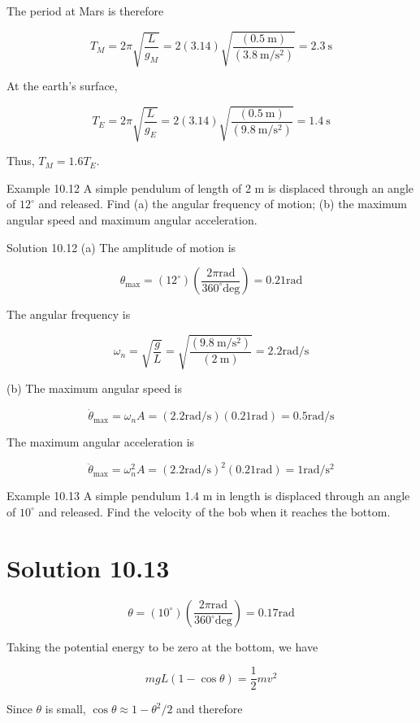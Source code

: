 \documentclass[10pt]{article}
\begin{document}
The period at Mars is therefore

$$
T_{M}=2 \pi \sqrt{\frac{L}{g_{M}}}=2(3.14) \sqrt{\frac{(0.5 \mathrm{~m})}{\left(3.8 \mathrm{~m} / \mathrm{s}^{2}\right)}}=2.3 \mathrm{~s}
$$

At the earth's surface,

$$
T_{E}=2 \pi \sqrt{\frac{L}{g_{E}}}=2(3.14) \sqrt{\frac{(0.5 \mathrm{~m})}{\left(9.8 \mathrm{~m} / \mathrm{s}^{2}\right)}}=1.4 \mathrm{~s}
$$

Thus, $T_{M}=1.6 T_{E}$.

Example 10.12 A simple pendulum of length of 2 m is displaced through an angle of $12^{\circ}$ and released. Find (a) the angular frequency of motion; (b) the maximum angular speed and maximum angular acceleration.

Solution 10.12 (a) The amplitude of motion is

$$
\theta_{\max }=\left(12^{\circ}\right)\left(\frac{2 \pi \mathrm{rad}}{360^{\circ} \mathrm{deg}}\right)=0.21 \mathrm{rad}
$$

The angular frequency is

$$
\omega_{n}=\sqrt{\frac{g}{L}}=\sqrt{\frac{\left(9.8 \mathrm{~m} / \mathrm{s}^{2}\right)}{(2 \mathrm{~m})}}=2.2 \mathrm{rad} / \mathrm{s}
$$

(b) The maximum angular speed is

$$
\dot{\theta}_{\max }=\omega_{n} A=(2.2 \mathrm{rad} / \mathrm{s})(0.21 \mathrm{rad})=0.5 \mathrm{rad} / \mathrm{s}
$$

The maximum angular acceleration is

$$
\ddot{\theta}_{\max }=\omega_{n}^{2} A=(2.2 \mathrm{rad} / \mathrm{s})^{2}(0.21 \mathrm{rad})=1 \mathrm{rad} / \mathrm{s}^{2}
$$

Example 10.13 A simple pendulum 1.4 m in length is displaced through an angle of $10^{\circ}$ and released. Find the velocity of the bob when it reaches the bottom.

\section*{Solution 10.13}
$$
\theta=\left(10^{\circ}\right)\left(\frac{2 \pi \mathrm{rad}}{360^{\circ} \mathrm{deg}}\right)=0.17 \mathrm{rad}
$$

Taking the potential energy to be zero at the bottom, we have

$$
m g L(1-\cos \theta)=\frac{1}{2} m v^{2}
$$

Since $\theta$ is small, $\cos \theta \approx 1-\theta^{2} / 2$ and therefore
\end{document}
